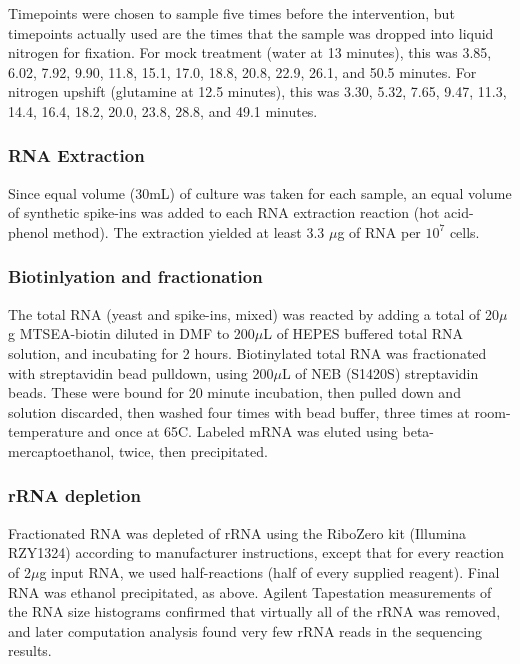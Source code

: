 Timepoints were chosen to sample five times before the intervention,
but timepoints actually used are the times that the sample was dropped
into liquid nitrogen for fixation.
For mock treatment (water at 13 minutes), this was 
3.85, 6.02, 7.92, 9.90, 11.8, 15.1, 17.0, 18.8, 20.8, 22.9, 26.1, 
and 50.5 minutes. 
For nitrogen upshift (glutamine at 12.5 minutes), this was
3.30, 5.32, 7.65, 9.47, 11.3, 14.4, 16.4, 18.2, 20.0, 23.8, 28.8, 
and 49.1 minutes.

\subsubsection{RNA Extraction}

Since equal volume (30mL) of culture was taken for each sample, an equal
volume of synthetic spike-ins was added to each RNA extraction reaction
(hot acid-phenol method).
The extraction yielded at least 3.3 \(\mu\)g of RNA per \(10^7\) cells.

\subsubsection{Biotinlyation and fractionation}

The total RNA (yeast and spike-ins, mixed) was reacted by adding
a total of 20$\mu$g MTSEA-biotin diluted in DMF to
200$\mu$L of HEPES buffered total RNA solution, 
and incubating for 2 hours.
Biotinylated total RNA was fractionated with streptavidin bead
pulldown, using 200\(\mu\)L of NEB (S1420S) streptavidin beads. 
These were bound for 20 minute incubation, then pulled down and
solution discarded, then washed four times with bead buffer, three
times at room-temperature and once at 65C. Labeled mRNA was eluted
using beta-mercaptoethanol, twice, then precipitated.

\subsubsection{rRNA depletion}

Fractionated RNA was depleted of rRNA using the RiboZero kit (Illumina
RZY1324) according to manufacturer instructions, except that for
every reaction of 2\(\mu\)g input RNA, we used half-reactions 
(half of every supplied reagent). 
Final RNA was ethanol precipitated, as above. Agilent
Tapestation measurements of the RNA size histograms confirmed that
virtually all of the rRNA was removed, and later computation analysis
found very few rRNA reads in the sequencing results.


